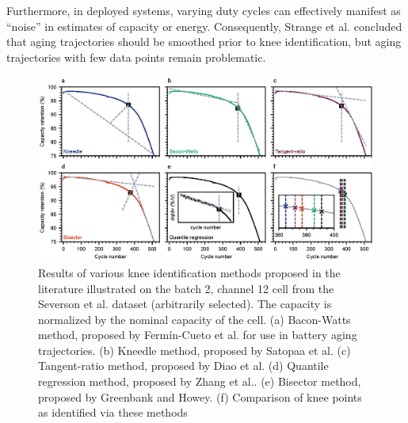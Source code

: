 \documentclass[journal=jpclcd,manuscript=article]{achemso}
\begin{document}
Furthermore, in deployed systems, varying duty cycles can effectively manifest as ``noise'' in estimates of capacity or energy.
Consequently, Strange et al.\cite{strange_elbows_2021} concluded that aging trajectories should be smoothed prior to knee identification, but aging trajectories with few data points remain problematic.

\begin{figure}[h!tb]
\centering
\includegraphics[scale=1]{figures/knee_identification_methods.eps}
\caption{Results of various knee identification methods proposed in the literature illustrated on the batch 2, channel 12 cell from the Severson et al.\cite{severson_data-driven_2019} dataset (arbitrarily selected). The capacity is normalized by the nominal capacity of the cell.
(a) Bacon-Watts method, proposed by Fermín-Cueto et al. \cite{fermin-cueto_identification_2020} for use in battery aging trajectories.
(b) Kneedle method, proposed by Satopaa et al.\cite{satopaa_finding_2011}
(c) Tangent-ratio method, proposed by Diao et al.\cite{diao_algorithm_2019}
(d) Quantile regression method, proposed by Zhang et al.\cite{zhang_accelerated_2019}.
(e) Bisector method, proposed by Greenbank and Howey.\cite{greenbank_automated_2021}
(f) Comparison of knee points as identified via these methods}
\label{fig:knee_identification_methods}
\end{figure}
\end{document}
